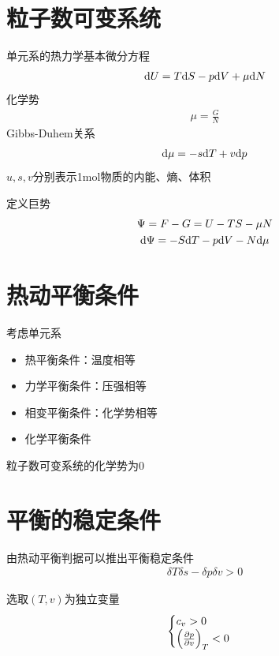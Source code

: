 \section{粒子数可变系统}

单元系的热力学基本微分方程
\begin{gather*}
    \mathrm{d} U = T \mathrm{d} S - p \mathrm{d} V + \mu \mathrm{d} N
\end{gather*}
化学势
\begin{gather*}
    \mu = \frac{G}{N}
\end{gather*}
Gibbs-Duhem关系
\begin{gather*}
    \mathrm{d} \mu = -s \mathrm{d} T + v \mathrm{d} p
\end{gather*}
$u, s, v$分别表示1mol物质的内能、熵、体积

定义巨势
\begin{gather*}
    \Psi = F - G = U - TS - \mu N
    \\
    \mathrm{d} \Psi = -S \mathrm{d} T - p \mathrm{d} V - N \mathrm{d} \mu
\end{gather*}

\section{热动平衡条件}

考虑单元系
\begin{itemize}
    \item 热平衡条件：温度相等
    \item 力学平衡条件：压强相等
    \item 相变平衡条件：化学势相等
    \item 化学平衡条件
\end{itemize}

粒子数可变系统的化学势为$0$

\section{平衡的稳定条件}

由热动平衡判据可以推出平衡稳定条件
\begin{gather*}
    \delta T \delta s - \delta p \delta v > 0
\end{gather*}

选取$(T, v)$为独立变量
\begin{gather*}
    \begin{cases}
        c_v >0
        \\
        \left(\frac{\partial p}{\partial v}\right)_T < 0
    \end{cases}
\end{gather*}

